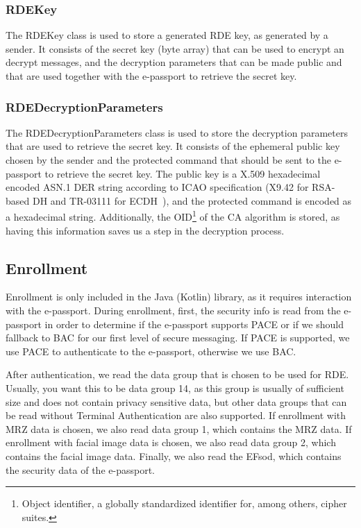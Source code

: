 \subsubsection{\textsf{RDEKey}}\label{subsubsec:rdekey}
The \textsf{RDEKey} class is used to store a generated RDE key, as generated by a sender.
It consists of the secret key (byte array) that can be used to encrypt an decrypt messages, and the decryption parameters that can be made public and that are used together with the e-passport to retrieve the secret key.

\subsubsection{\textsf{RDEDecryptionParameters}}\label{subsubsec:rde-decryption-parameters}
The \textsf{RDEDecryptionParameters} class is used to store the decryption parameters that are used to retrieve the secret key.
It consists of the ephemeral public key chosen by the sender and the protected command that should be sent to the e-passport to retrieve the secret key.
The public key is a X.509 hexadecimal encoded ASN.1 DER string according to ICAO specification (X9.42 for RSA-based DH and TR-03111 for ECDH~\cite{icao9303securitymechanisms}), and the protected command is encoded as a hexadecimal string.
Additionally, the OID\footnote{Object identifier, a globally standardized identifier for, among others, cipher suites.} of the CA algorithm is stored, as having this information saves us a step in the decryption process.

\subsection{Enrollment}\label{subsec:enrollment}
Enrollment is only included in the Java (Kotlin) library, as it requires interaction with the e-passport.
During enrollment, first, the security info is read from the e-passport in order to determine if the e-passport supports PACE or if we should fallback to BAC for our first level of secure messaging.
If PACE is supported, we use PACE to authenticate to the e-passport, otherwise we use BAC.

After authentication, we read the data group that is chosen to be used for RDE.
Usually, you want this to be data group 14, as this group is usually of sufficient size and does not contain privacy sensitive data, but other data groups that can be read without Terminal Authentication are also supported.
If enrollment with MRZ data is chosen, we also read data group 1, which contains the MRZ data.
If enrollment with facial image data is chosen, we also read data group 2, which contains the facial image data.
Finally, we also read the EFsod, which contains the security data of the e-passport.


